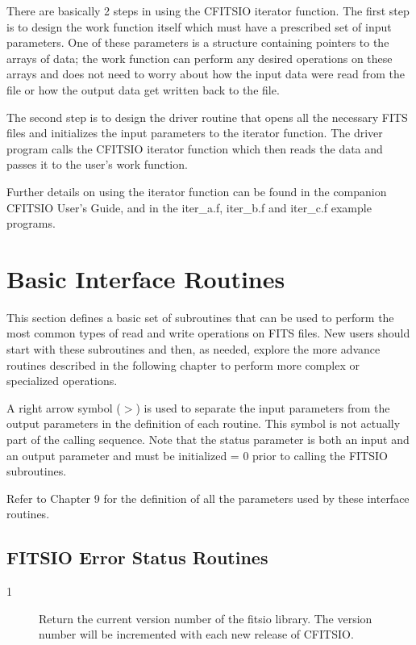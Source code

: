 \documentclass[11pt]{book}
\begin{document}
There are basically 2 steps in using the CFITSIO iterator function.
The first step is to design the work function itself which must have a
prescribed set of input parameters.  One of these parameters is a
structure containing pointers to the arrays of data; the work function
can perform any desired operations on these arrays and does not need to
worry about how the input data were read from the file or how the
output data get written back to the file.

The second step is to design the driver routine that opens all the
necessary FITS files and initializes  the input parameters to the
iterator function.  The driver program calls the CFITSIO iterator
function which then reads the data and passes it to the user's work
function.

Further details on using the iterator function can be found in the
companion CFITSIO User's Guide, and in the iter\_a.f, iter\_b.f and
iter\_c.f example programs.



\chapter{  Basic Interface Routines }

This section defines a basic set of subroutines that can be
used to perform the most common types of read and write operations
on FITS files.  New users should start with these subroutines and
then, as needed, explore the more advance routines described in
the following chapter to perform more complex or specialized operations.

A right arrow symbol ($>$) is used to separate the input parameters from
the output parameters in the  definition of each routine.  This symbol
is not actually part of the calling sequence.  Note that
the status parameter is both an input and an output parameter
and must be initialized = 0 prior to calling the FITSIO subroutines.

Refer to Chapter 9 for the definition of all the parameters
used by these interface routines.


\section{FITSIO Error Status Routines \label{FTVERS}}


\begin{description}
\item[1 ] Return the current version number of the fitsio library.
    The version number will be incremented with each new
   release of CFITSIO.
\end{description}
\end{document}

